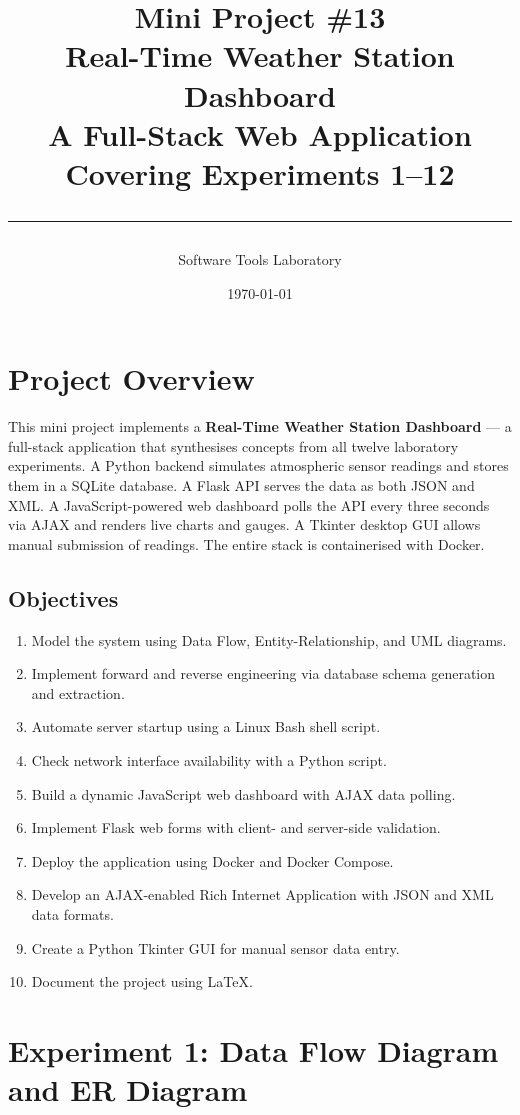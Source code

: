 \documentclass[12pt,a4paper]{article}
\title{
  \vspace{-1cm}
  {\Large \textbf{Mini Project \#13}}\\[0.4cm]
  {\LARGE \textbf{Real-Time Weather Station Dashboard}}\\[0.3cm]
  {\large A Full-Stack Web Application Covering Experiments 1--12}\\[0.5cm]
  \hrule
}
\author{Software Tools Laboratory}
\date{\today}
\begin{document}
\maketitle\thispagestyle{fancy}
\tableofcontents\newpage

\section{Project Overview}
This mini project implements a \textbf{Real-Time Weather Station Dashboard} — a full-stack application that synthesises concepts from all twelve laboratory experiments. A Python backend simulates atmospheric sensor readings and stores them in a SQLite database. A Flask API serves the data as both JSON and XML. A JavaScript-powered web dashboard polls the API every three seconds via AJAX and renders live charts and gauges. A Tkinter desktop GUI allows manual submission of readings. The entire stack is containerised with Docker.

\subsection{Objectives}
\begin{enumerate}[label=\arabic*.]
  \item Model the system using Data Flow, Entity-Relationship, and UML diagrams.
  \item Implement forward and reverse engineering via database schema generation and extraction.
  \item Automate server startup using a Linux Bash shell script.
  \item Check network interface availability with a Python script.
  \item Build a dynamic JavaScript web dashboard with AJAX data polling.
  \item Implement Flask web forms with client- and server-side validation.
  \item Deploy the application using Docker and Docker Compose.
  \item Develop an AJAX-enabled Rich Internet Application with JSON and XML data formats.
  \item Create a Python Tkinter GUI for manual sensor data entry.
  \item Document the project using \LaTeX.
\end{enumerate}

\section{Experiment 1: Data Flow Diagram and ER Diagram}
\end{document}
